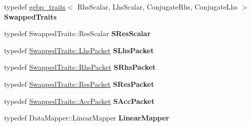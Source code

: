 \begin{DoxyCompactItemize}
typedef \hyperlink{class_eigen_1_1internal_1_1gebp__traits}{gebp\+\_\+traits}$<$ Rhs\+Scalar, Lhs\+Scalar, Conjugate\+Rhs, Conjugate\+Lhs $>$ {\bfseries Swapped\+Traits}
\item 
\mbox{\label{struct_eigen_1_1internal_1_1gebp__kernel_a91134d92cfbc82bccc82836d0589c78a}} 
typedef Swapped\+Traits\+::\+Res\+Scalar {\bfseries S\+Res\+Scalar}
\item 
\mbox{\label{struct_eigen_1_1internal_1_1gebp__kernel_ac6d9a01a6cd5336e08b07c58efee44b6}} 
typedef \hyperlink{class_eigen_1_1internal_1_1_tensor_lazy_evaluator_writable}{Swapped\+Traits\+::\+Lhs\+Packet} {\bfseries S\+Lhs\+Packet}
\item 
\mbox{\label{struct_eigen_1_1internal_1_1gebp__kernel_a6a1a2ff6e30bb70ed43572392dd0530a}} 
typedef \hyperlink{class_eigen_1_1internal_1_1_tensor_lazy_evaluator_writable}{Swapped\+Traits\+::\+Rhs\+Packet} {\bfseries S\+Rhs\+Packet}
\item 
\mbox{\label{struct_eigen_1_1internal_1_1gebp__kernel_a0c4a0b1397b0fe4fc66acd81e87fd614}} 
typedef \hyperlink{class_eigen_1_1internal_1_1_tensor_lazy_evaluator_writable}{Swapped\+Traits\+::\+Res\+Packet} {\bfseries S\+Res\+Packet}
\item 
\mbox{\label{struct_eigen_1_1internal_1_1gebp__kernel_a32e53eb27c3a5b3fe752036a608aab30}} 
typedef \hyperlink{class_eigen_1_1internal_1_1_tensor_lazy_evaluator_writable}{Swapped\+Traits\+::\+Acc\+Packet} {\bfseries S\+Acc\+Packet}
\item 
\mbox{\label{struct_eigen_1_1internal_1_1gebp__kernel_a012d16a8957ad24519397e9f6ed00ab5}} 
typedef Data\+Mapper\+::\+Linear\+Mapper {\bfseries Linear\+Mapper}
\end{DoxyCompactItemize}
